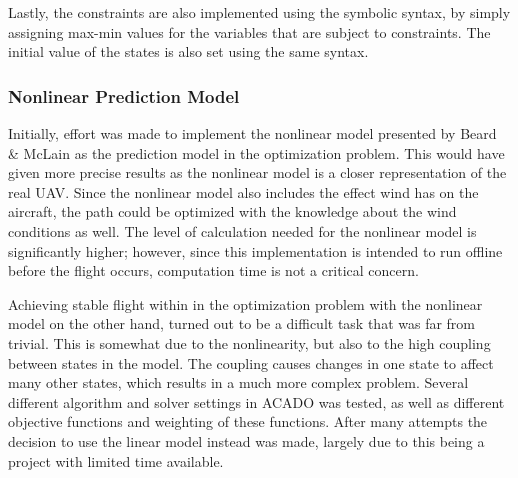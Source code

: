 Lastly, the constraints are also implemented using the symbolic syntax, by simply assigning max-min values for the variables that are subject to constraints. The initial value of the states is also set using the same syntax. 


\subsubsection{Nonlinear Prediction Model}

Initially, effort was made to implement the nonlinear model presented by Beard \& McLain \cite{uavBEARD} as the prediction model in the optimization problem. This would have given more precise results as the nonlinear model is a closer representation of the real UAV. Since the nonlinear model also includes the effect wind has on the aircraft, the path could be optimized with the knowledge about the wind conditions as well. The level of calculation needed for the nonlinear model is significantly higher; however, since this implementation is intended to run offline before the flight occurs, computation time is not a critical concern.

Achieving stable flight within in the optimization problem with the nonlinear model on the other hand, turned out to be a difficult task that was far from trivial. This is somewhat due to the nonlinearity, but also to the high coupling between states in the model. The coupling causes changes in one state to affect many other states, which results in a much more complex problem. Several different algorithm and solver settings in ACADO was tested, as well as different objective functions and weighting of these functions. After many attempts the decision to use the linear model instead was made, largely due to this being a project with limited time available.